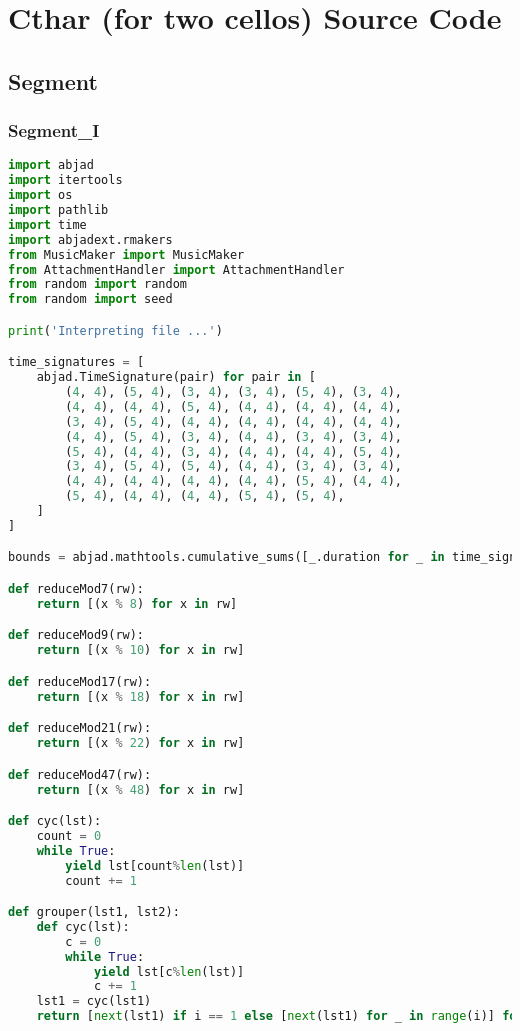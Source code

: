 \section{Cthar (for two cellos) Source Code}
\subsection{Segment}
\subsubsection{Segment\_I}

\singlespace
\begin{lstlisting}[language=Python, caption=Cthar Segment\_I]
import abjad
import itertools
import os
import pathlib
import time
import abjadext.rmakers
from MusicMaker import MusicMaker
from AttachmentHandler import AttachmentHandler
from random import random
from random import seed

print('Interpreting file ...')

time_signatures = [
    abjad.TimeSignature(pair) for pair in [
        (4, 4), (5, 4), (3, 4), (3, 4), (5, 4), (3, 4),
        (4, 4), (4, 4), (5, 4), (4, 4), (4, 4), (4, 4),
        (3, 4), (5, 4), (4, 4), (4, 4), (4, 4), (4, 4),
        (4, 4), (5, 4), (3, 4), (4, 4), (3, 4), (3, 4),
        (5, 4), (4, 4), (3, 4), (4, 4), (4, 4), (5, 4),
        (3, 4), (5, 4), (5, 4), (4, 4), (3, 4), (3, 4),
        (4, 4), (4, 4), (4, 4), (4, 4), (5, 4), (4, 4),
        (5, 4), (4, 4), (4, 4), (5, 4), (5, 4),
    ]
]

bounds = abjad.mathtools.cumulative_sums([_.duration for _ in time_signatures])

def reduceMod7(rw):
    return [(x % 8) for x in rw]

def reduceMod9(rw):
    return [(x % 10) for x in rw]

def reduceMod17(rw):
    return [(x % 18) for x in rw]

def reduceMod21(rw):
    return [(x % 22) for x in rw]

def reduceMod47(rw):
    return [(x % 48) for x in rw]

def cyc(lst):
    count = 0
    while True:
        yield lst[count%len(lst)]
        count += 1

def grouper(lst1, lst2):
    def cyc(lst):
        c = 0
        while True:
            yield lst[c%len(lst)]
            c += 1
    lst1 = cyc(lst1)
    return [next(lst1) if i == 1 else [next(lst1) for _ in range(i)] for i in lst2]


\end{lstlisting}
